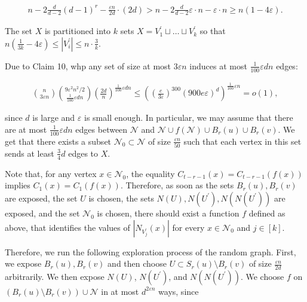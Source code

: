 \documentclass[10pt,a4paper]{article}
\begin{document}
\[\begin{gathered}
n-2\frac{d}{d-2}(d-1)^{r}-\frac{\varepsilon n}{2d}\cdot(2d)>n-2\frac{d}{d-2}\varepsilon\cdot n-\varepsilon\cdot n\geq n(1-4\varepsilon).
\end{gathered}\]


The set $X$ is partitioned into $k$ sets $X=V^{\prime}_{1}\sqcup\ldots\sqcup V^{\prime}_{k}$ so that $n(\frac{1}{3k}-4\varepsilon)\leq|V^{\prime}_{i}|\leq n\cdot\frac{3}{k}$.\par




Due to Claim 10, whp any set of size at most $3\varepsilon n$ induces at most $\frac{1}{100}\varepsilon dn$ edges:\par


\[\begin{gathered}
{n\choose 3\varepsilon n}{9\varepsilon^{2}n^{2}/2\choose\frac{1}{100}\varepsilon dn}\left(\frac{2d}{n}\right)^{\frac{1}{100}\varepsilon dn}\leq\left(\left(\frac{e}{3\varepsilon}\right)^{300}\left(900e\varepsilon\right)^{d}\right)^{\frac{1}{100}\varepsilon n}=o(1),
\end{gathered}\]


since $d$ is large and $\varepsilon$ is small enough. In particular, we may assume that there are at most $\frac{1}{100}\varepsilon dn$ edges between $\mathcal{N}$ and $\mathcal{N}\cup f(\mathcal{N})\cup B_{r}(u)\cup B_{r}(v)$. We get that there exists a subset $\mathcal{N}_{0}\subset\mathcal{N}$ of size $\frac{\varepsilon n}{50}$ such that each vertex in this set sends at least $\frac{3}{4}d$ edges to $X$.\par




Note that, for any vertex $x\in\mathcal{N}_{0}$, the equality $C_{t-r-1}(x)=C_{t-r-1}(f(x))$ implies $C_{1}(x)=C_{1}(f(x))$. Therefore, as soon as the sets $B_{r}(u),B_{r}(v)$ are exposed, the set $U$ is chosen, the sets $N(U),N(U^{\prime}),N(N(U^{\prime}))$ are exposed, and the set $\mathcal{N}_{0}$ is chosen, there should exist a function $f$ defined as above, that identifies the values of $|N_{V^{\prime}_{j}}(x)|$ for every $x\in\mathcal{N}_{0}$ and $j\in[k]$.\par




Therefore, we run the following exploration process of the random graph. First, we expose $B_{r}(u),B_{r}(v)$ and then choose $U\subset S_{r}(u)\setminus B_{r}(v)$ of size $\frac{\varepsilon n}{2d}$ arbitrarily. We then expose $N(U)$, $N(U^{\prime})$, and $N(N(U^{\prime}))$. We choose $f$ on $(B_{r}(u)\setminus B_{r}(v))\cup\mathcal{N}$ in at most $d^{2\varepsilon n}$ ways, since\par
\end{document}
